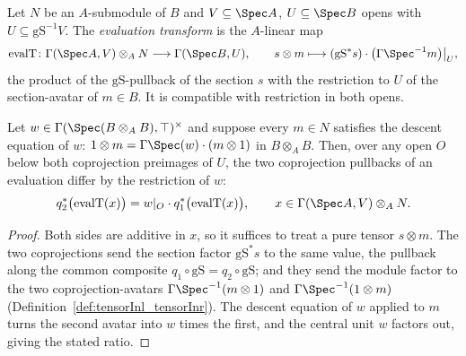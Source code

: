 \begin{definition}
  \label{def:evalT}
  \leanok
  Let \(N\) be an \(A\)-submodule of \(B\) and \(V \subseteq \Spec A\), \(U \subseteq \Spec B\)
  opens with \(U \subseteq \mathrm{gS}^{-1}V\).  The \emph{evaluation transform} is the
  \(A\)-linear map
  \[
    \mathrm{evalT} \colon \Gamma(\Spec A, V) \otimes_A N \longrightarrow \Gamma(\Spec B, U),
    \qquad s \otimes m \longmapsto (\mathrm{gS}^{*} s) \cdot \bigl(\Gamma\Spec^{-1} m\bigr)
    \big|_{U},
  \]
  the product of the \(\mathrm{gS}\)-pullback of the section \(s\) with the restriction to
  \(U\) of the section-avatar of \(m \in B\).  It is compatible with restriction in both opens.
\end{definition}

\begin{lemma}
  \label{lem:evalT_ratio}
  \leanok
  Let \(w \in \Gamma(\Spec(B \otimes_A B), \top)^{\times}\) and suppose every \(m \in N\)
  satisfies the descent equation of \(w\): \(1 \otimes m = \Gamma\Spec(w) \cdot (m \otimes 1)\)
  in \(B \otimes_A B\).  Then, over any open \(O\) below both coprojection preimages of \(U\),
  the two coprojection pullbacks of an evaluation differ by the restriction of \(w\):
  \[
    q_2^{*}\bigl(\mathrm{evalT}(x)\bigr) = w|_{O} \cdot q_1^{*}\bigl(\mathrm{evalT}(x)\bigr),
    \qquad x \in \Gamma(\Spec A, V) \otimes_A N.
  \]
\end{lemma}
\begin{proof}
  \leanok
  Both sides are additive in \(x\), so it suffices to treat a pure tensor \(s \otimes m\).  The
  two coprojections send the section factor \(\mathrm{gS}^{*} s\) to the same value, the
  pullback along the common composite \(q_1 \circ \mathrm{gS} = q_2 \circ \mathrm{gS}\); and
  they send the module factor to the two coprojection-avatars \(\Gamma\Spec^{-1}(m \otimes 1)\)
  and \(\Gamma\Spec^{-1}(1 \otimes m)\) (Definition~\ref{def:tensorInl_tensorInr}).  The descent
  equation of \(w\) applied to \(m\) turns the second avatar into \(w\) times the first, and the
  central unit \(w\) factors out, giving the stated ratio.
\end{proof}

